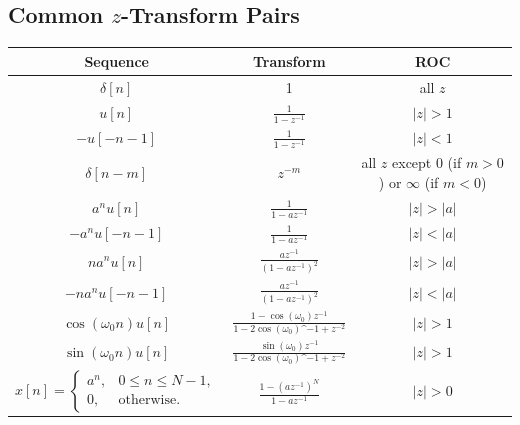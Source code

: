 \subsection{Common $z$-Transform Pairs}
\begin{table}[H]
    \centering
    \begin{tabular}{c c c}
    \toprule
    \textbf{Sequence}    & \textbf{Transform}     & \textbf{ROC} \\ 
    \midrule
        $\delta[n]$     &   1   & all $z$  \\[.5em]
        
        $u[n]$     &   $\frac{1}{1-z^{-1}}$   & $\lvert z \rvert >1$  \\[.5em]
        
        $-u[-n-1]$     &   $\frac{1}{1-z^{-1}}$   &  $\lvert z \rvert <1$  \\[.5em]
        
        $\delta[n-m]$     &   $z^{-m}$   & all $z$ except 0 (if $m>0$) or $\infty$ (if $m<0$) \\[.5em]
        
        $a^{n}u[n]$     &  $\frac{1}{1-az^{-1}}$    & $\lvert z \rvert > \lvert a \rvert$\\[.5em]
        
        $-a^{n}u[-n-1]$     &  $\frac{1}{1-az^{-1}}$    & $\lvert z \rvert < \lvert a \rvert$\\[.5em]
        
        $na^{n}u[n]$     &  $\frac{az^{-1}}{(1-az^{-1})^2}$    & $\lvert z \rvert > \lvert a \rvert$\\[.5em]
        
        $-na^{n}u[-n-1]$     &  $\frac{az^{-1}}{(1-az^{-1})^2}$    & $\lvert z \rvert < \lvert a \rvert$\\[.5em]
        
        $\cos(\omega_0 n)u[n]$     &  $\frac{1-\cos(\omega_0)z^{-1}}{1-2\cos(\omega_0)\^{-1}+z^{-2}}$    & $\lvert z \rvert > 1$\\[.5em]

        $\sin(\omega_0 n)u[n]$     &  $\frac{\sin(\omega_0)z^{-1}}{1-2\cos(\omega_0)\^{-1}+z^{-2}}$    & $\lvert z \rvert > 1$\\[.5em]

        $x[n] = 
    \begin{cases}
        a^n,    & 0 \leq n \leq N-1, \\
        0,      & \text{otherwise}.
    \end{cases}$    & $\frac{1-(az^{-1})^N}{1-az^{-1}}$     & $\lvert z \rvert > 0$ \\

    \bottomrule
    \end{tabular}
\end{table}

